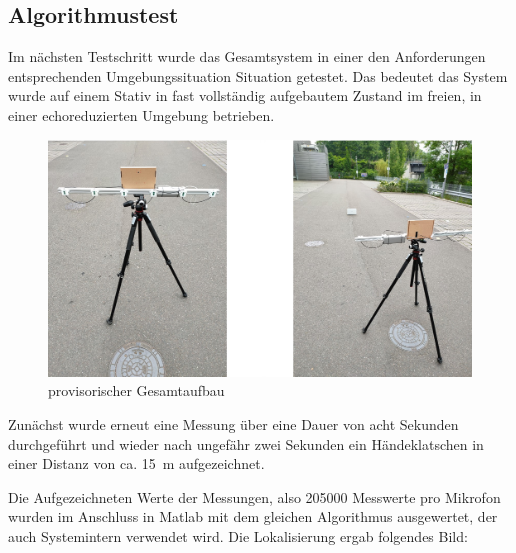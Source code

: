 \subsection{Algorithmustest}

Im nächsten Testschritt wurde das Gesamtsystem in einer den Anforderungen entsprechenden Umgebungssituation Situation getestet. Das bedeutet das System wurde auf einem Stativ in fast vollständig aufgebautem Zustand im freien, in einer echoreduzierten Umgebung betrieben.

\begin{figure}[h]
	\begin{center}
		\includegraphics[scale=0.1]{Sections/Tests/Gesamtaufbau}
	\end{center}
	\caption{provisorischer Gesamtaufbau}
	\label{fig:Test_4}
\end{figure}

Zunächst wurde erneut eine Messung über eine Dauer von acht Sekunden durchgeführt und wieder nach ungefähr zwei Sekunden ein Händeklatschen in einer Distanz von ca. \SI{15}{m} aufgezeichnet.

Die Aufgezeichneten Werte  der Messungen, also 205000 Messwerte pro Mikrofon wurden im Anschluss in Matlab mit dem gleichen Algorithmus ausgewertet, der auch Systemintern verwendet wird. Die Lokalisierung ergab folgendes Bild:

